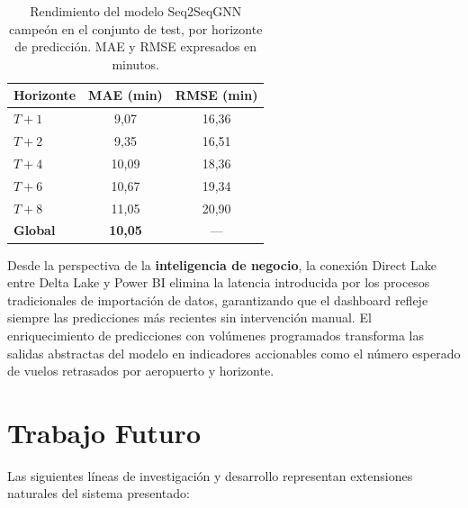 \documentclass[12pt,oneside,a4paper]{report}
\renewcommand{\_}{\textunderscore\allowbreak}
\begin{document}
{\setlength{\intextsep}{16pt}
 \setlength{\abovecaptionskip}{6pt}   %
 \setlength{\belowcaptionskip}{10pt}  %
\begin{table}[h!]
\centering
\caption{Rendimiento del modelo Seq2SeqGNN campeón en el conjunto de test, por horizonte
de predicción. MAE y RMSE expresados en minutos.}
\label{tab:resultados_mae}
\begin{tabular}{@{}lcc@{}}
\toprule
\textbf{Horizonte} & \textbf{MAE (min)} & \textbf{RMSE (min)} \\
\midrule
$T+1$           & 9{,}07           & 16{,}36 \\
$T+2$           & 9{,}35           & 16{,}51 \\
$T+4$           & 10{,}09          & 18{,}36 \\
$T+6$           & 10{,}67          & 19{,}34 \\
$T+8$           & 11{,}05          & 20{,}90 \\
\midrule
\textbf{Global} & \textbf{10{,}05} & ---     \\
\bottomrule
\end{tabular}
\end{table}
}

Desde la perspectiva de la \textbf{inteligencia de negocio}, la conexión Direct Lake entre Delta Lake y Power BI elimina la latencia introducida por los procesos tradicionales de importación de datos, garantizando que el dashboard refleje siempre las predicciones más recientes sin intervención manual. El enriquecimiento de predicciones con volúmenes programados transforma las salidas abstractas del modelo en indicadores accionables como el número esperado de vuelos retrasados por aeropuerto y horizonte.

\section{Trabajo Futuro}
\label{sec:trabajo_futuro}

Las siguientes líneas de investigación y desarrollo representan extensiones naturales del sistema presentado:
\end{document}
